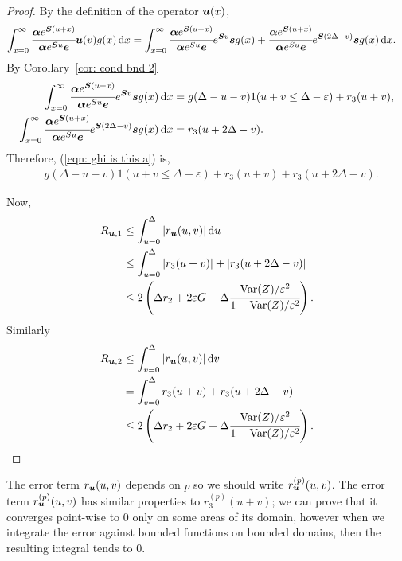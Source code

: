 \begin{proof}
	By the definition of the operator \({\boldsymbol u}(x)\), 
	\begin{align}
		\int_{x=0}^\infty \cfrac{\boldsymbol \alpha  e^{\boldsymbol{S} (u+x)} }{\boldsymbol \alpha  e^{\boldsymbol{S} u} \boldsymbol e} {\boldsymbol u}(v)g(x)\, \mathrm{d} x 		
		&=
			\displaystyle\int_{x=0}^\infty 
				\cfrac{
					\boldsymbol \alpha e^{\boldsymbol S(u+x)}
					}{
					\boldsymbol \alpha e^{Su}\boldsymbol e
					} 
				e^{\boldsymbol{S}v}\boldsymbol s g(x)
				+
				\cfrac{
					\boldsymbol \alpha e^{\boldsymbol S(u+x)}
					}{
					\boldsymbol \alpha e^{Su}\boldsymbol e
					} 
				e^{\boldsymbol{S}(2\Delta-v)}\boldsymbol sg(x) \, \mathrm{d} x. \label{eqn: ghi is this a}
	\end{align}
	By Corollary~\ref{cor: cond bnd 2} 
	\begin{align}
		\int_{x=0}^\infty 
				\cfrac{
					\boldsymbol \alpha e^{\boldsymbol S(u+x)}
					}{
					\boldsymbol \alpha e^{Su}\boldsymbol e
					} 
				e^{\boldsymbol{S}v}\boldsymbol s g(x)\, \mathrm{d} x 
				&= g(\Delta-u-v) 1(u+v\leq\Delta-\varepsilon) + r_3 (u+v), \label{eqn: dkskkk2}
		\\
		\int_{x=0}^\infty\cfrac{
					\boldsymbol \alpha e^{\boldsymbol S(u+x)}
					}{
					\boldsymbol \alpha e^{Su}\boldsymbol e
					} 
				e^{\boldsymbol{S}(2\Delta-v)}\boldsymbol sg(x) \, \mathrm{d} x 
				&= r_3 (u+2\Delta - v).
	\end{align}
	Therefore, (\ref{eqn: ghi is this a}) is, 
	\begin{align}
		&g(\Delta-u-v) 1(u+v\leq\Delta-\varepsilon) + r_3 (u+v) + r_3 (u+2\Delta - v).
	\end{align}	
	
	Now,
	\begin{align*}
		R_{{{\boldsymbol u}},1}&\leq \int_{u=0}^{\Delta}| r_{{\boldsymbol u}}(u,v)|\, \mathrm{d} u
		\\& \leq \int_{u=0}^{\Delta} |r_3 (u+v)| + |r_3 (u+2\Delta - v) |
		\\&\leq 2\left(\Delta r_2 + 2\varepsilon G + \Delta\cfrac{\mathrm{Var}(Z)/\varepsilon^2}{1-\mathrm{Var}(Z)/\varepsilon^2}\right).
	\end{align*}
	Similarly 
	\begin{align*}
		R_{{{\boldsymbol u}},2}&\leq \int_{v=0}^{\Delta}| r_{{\boldsymbol u}}(u,v)|\, \mathrm{d} v
		\\&= \int_{v=0}^{\Delta} r_3(u+v) + r_3(u+2\Delta-v) 
		\\& \leq 2\left(\Delta r_2 + 2\varepsilon G + \Delta\cfrac{\mathrm{Var}(Z)/\varepsilon^2}{1-\mathrm{Var}(Z)/\varepsilon^2}\right).
	\end{align*}
\end{proof}

The error term \(r_{{\boldsymbol u}}(u,v)\) depends on \(p\) so we should write \(r_{{\boldsymbol u}}^{(p)}(u,v)\). The error term \(r_{{\boldsymbol u}}^{(p)}(u,v)\) has similar properties to \(r_3^{(p)}(u+v)\); we can prove that it converges point-wise to \(0\) only on some areas of its domain, however when we integrate the error against bounded functions on bounded domains, then the resulting integral tends to \(0\). 

